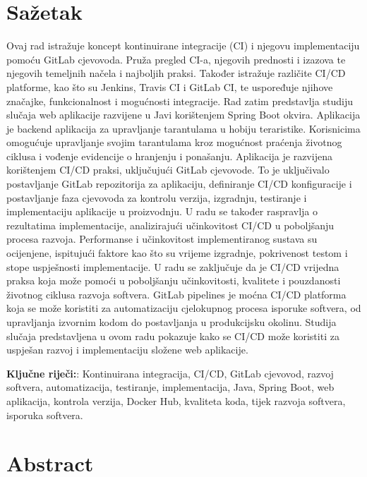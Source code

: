 \documentclass[a4paper,12pt,oneside]{article}
\begin{document}
\newpage
\section*{Sa\v{z}etak}

Ovaj rad istražuje koncept kontinuirane integracije (CI) i njegovu implementaciju pomoću GitLab cjevovoda. Pruža pregled CI-a, njegovih prednosti i izazova te njegovih temeljnih načela i najboljih praksi. Također istražuje različite CI/CD platforme, kao što su Jenkins, Travis CI i GitLab CI, te uspoređuje njihove značajke, funkcionalnost i mogućnosti integracije. Rad zatim predstavlja studiju slučaja web aplikacije razvijene u Javi korištenjem Spring Boot okvira. Aplikacija je backend aplikacija za upravljanje tarantulama u hobiju teraristike. Korisnicima omogućuje upravljanje svojim tarantulama kroz mogućnost praćenja životnog ciklusa i vođenje evidencije o hranjenju i ponašanju. Aplikacija je razvijena korištenjem CI/CD praksi, uključujući GitLab cjevovode. To je uključivalo postavljanje GitLab repozitorija za aplikaciju, definiranje CI/CD konfiguracije i postavljanje faza cjevovoda za kontrolu verzija, izgradnju, testiranje i implementaciju aplikacije u proizvodnju. U radu se također raspravlja o rezultatima implementacije, analizirajući učinkovitost CI/CD u poboljšanju procesa razvoja. Performanse i učinkovitost implementiranog sustava su ocijenjene, ispitujući faktore kao što su vrijeme izgradnje, pokrivenost testom i stope uspješnosti implementacije.
U radu se zaključuje da je CI/CD vrijedna praksa koja može pomoći u poboljšanju učinkovitosti, kvalitete i pouzdanosti životnog ciklusa razvoja softvera. GitLab pipelines je moćna CI/CD platforma koja se može koristiti za automatizaciju cjelokupnog procesa isporuke softvera, od upravljanja izvornim kodom do postavljanja u produkcijsku okolinu. Studija slučaja predstavljena u ovom radu pokazuje kako se CI/CD može koristiti za uspješan razvoj i implementaciju složene web aplikacije.

\bigskip
\noindent\textbf{Klju\v{c}ne rije\v{c}i:}: Kontinuirana integracija, CI/CD, GitLab cjevovod, razvoj softvera, automatizacija, testiranje, implementacija, Java, Spring Boot, web aplikacija, kontrola verzija, Docker Hub, kvaliteta koda, tijek razvoja softvera, isporuka softvera.


\newpage
\section*{Abstract}
\end{document}
